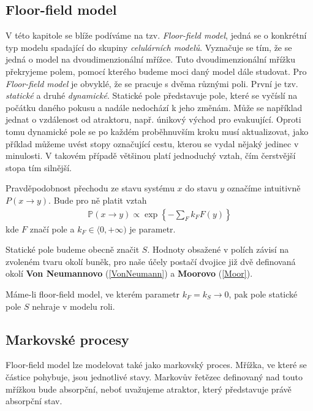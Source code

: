 \documentclass[a4paper, 12pt, fleqn]{article}
\begin{document}
	
	\subsection{Floor-field model}
	
	V této kapitole se blíže podíváme na tzv. \textit{Floor-field model}, jedná se o konkrétní typ modelu spadající do skupiny \textit{celulárních modelů}. 
	Vyznačuje se tím, že se jedná o model na dvoudimenzionální mřížce. Tuto dvoudimenzionální mřížku překryjeme polem, pomocí kterého budeme moci daný model dále studovat. 
	Pro \textit{Floor-field model} je obvyklé, že se pracuje s dvěma různými poli. První je tzv. \textit{statické} a druhé \textit{dynamické}. Statické pole představuje pole, které se vyčíslí na počátku daného pokusu a nadále nedochází k jeho změnám. Může se například jednat o vzdálenost od atraktoru, např. únikový východ pro evakuující. Oproti tomu dynamické pole se po každém proběhnuvším kroku musí aktualizovat, jako příklad můžeme uvést stopy označující cestu, kterou se vydal nějaký jedinec v minulosti. V takovém případě většinou platí jednoduchý vztah, čím čerstvější stopa tím silnější.
	
	Pravděpodobnost přechodu ze stavu systému $ x $ do stavu $ y $ označíme intuitivně $ P(x \rightarrow y) $. Bude pro ně platit vztah 
	\begin{align}
	\mathbb{P}(x \rightarrow y) \propto \exp\left\lbrace -\sum_{F}k_{F}F(y)\right\rbrace
	\label{Prechod}
	\end{align}
	kde $ F $ značí pole a $ k_{F} \in \langle 0, +\infty) $ je parametr.
	
	Statické pole budeme obecně značit $ S $. Hodnoty obsažené v polích závisí na zvoleném tvaru okolí buněk, pro naše účely postačí dvojice již dvě definovaná okolí \textbf{Von Neumannovo} (\ref{VonNeumann}) a \textbf{Moorovo} (\ref{Moor}).
	
	Máme-li floor-field model, ve kterém parametr $ k_{F} = k_{S} \rightarrow 0 $, pak pole statické pole $ S $ nehraje v modelu roli.  
	
	\subsection{Markovské procesy}
	
	Floor-field model lze modelovat také jako markovský proces. Mřížka, ve které se částice pohybuje, jsou jednotlivé stavy. Markovův řetězec definovaný nad touto mřížkou bude absorpční, neboť uvažujeme atraktor, který představuje právě absorpční stav.
	
\end{document}
